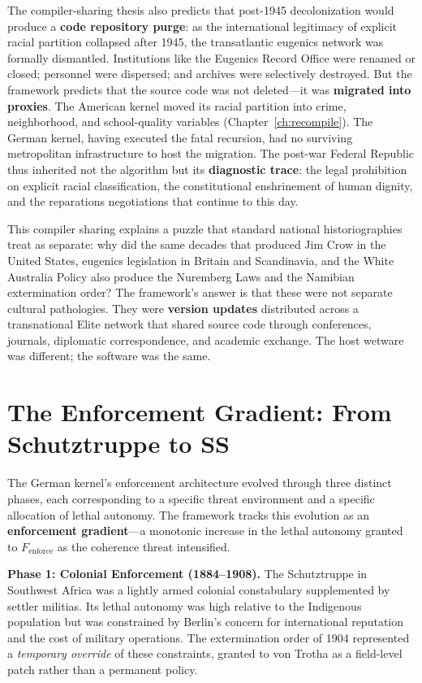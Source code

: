 The compiler-sharing thesis also predicts that post-1945 decolonization would produce a \textbf{code repository purge}: as the international legitimacy of explicit racial partition collapsed after 1945, the transatlantic eugenics network was formally dismantled. Institutions like the Eugenics Record Office were renamed or closed; personnel were dispersed; and archives were selectively destroyed. But the framework predicts that the source code was not deleted---it was \textbf{migrated into proxies}. The American kernel moved its racial partition into crime, neighborhood, and school-quality variables (Chapter~\ref{ch:recompile}). The German kernel, having executed the fatal recursion, had no surviving metropolitan infrastructure to host the migration. The post-war Federal Republic thus inherited not the algorithm but its \textbf{diagnostic trace}: the legal prohibition on explicit racial classification, the constitutional enshrinement of human dignity, and the reparations negotiations that continue to this day.

This compiler sharing explains a puzzle that standard national historiographies treat as separate: why did the same decades that produced Jim Crow in the United States, eugenics legislation in Britain and Scandinavia, and the White Australia Policy also produce the Nuremberg Laws and the Namibian extermination order? The framework's answer is that these were not separate cultural pathologies. They were \textbf{version updates} distributed across a transnational Elite network that shared source code through conferences, journals, diplomatic correspondence, and academic exchange. The host wetware was different; the software was the same.

\section{The Enforcement Gradient: From Schutztruppe to SS}
\label{sec:enforcement_gradient}

The German kernel's enforcement architecture evolved through three distinct phases, each corresponding to a specific threat environment and a specific allocation of lethal autonomy. The framework tracks this evolution as an \textbf{enforcement gradient}---a monotonic increase in the lethal autonomy granted to $F_{\text{enforce}}$ as the coherence threat intensified.

\textbf{Phase 1: Colonial Enforcement (1884--1908).} The Schutztruppe in Southwest Africa was a lightly armed colonial constabulary supplemented by settler militias. Its lethal autonomy was high relative to the Indigenous population but was constrained by Berlin's concern for international reputation and the cost of military operations. The extermination order of 1904 represented a \textit{temporary override} of these constraints, granted to von Trotha as a field-level patch rather than a permanent policy.

